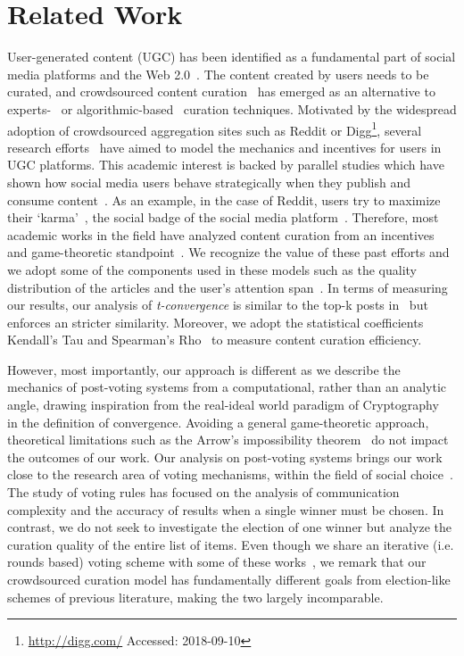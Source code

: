 \section{Related Work}
  User-generated content (UGC) has been identified as a fundamental part of social media platforms and the Web 2.0~\cite{kaplan2010users}. The content created by users needs to be curated, and crowdsourced content curation~\cite{askalidis2013theoretical} has emerged as an alternative to experts-~\cite{stanoevska2012content} or algorithmic-based~\cite{rader2015understanding} curation techniques. Motivated by the widespread adoption of crowdsourced aggregation sites such as Reddit or Digg\footnote{\url{http://digg.com/} Accessed: 2018-09-10}, several research efforts~\cite{das2010ranking,ghosh2011incentivizing} have aimed to model the mechanics and incentives for users in UGC platforms. This academic interest is backed by parallel studies which have shown how
social media users behave strategically when they publish and consume content~\cite{may2014filter}. As an example, in the case of Reddit, users try to maximize their `karma'~\cite{bergstrom2011don}, the social badge of the social media platform~\cite{anderson2013steering}.
   Therefore, most academic works in the field have analyzed content curation from an incentives and game-theoretic standpoint~\cite{ghosh2011incentivizing,das2010ranking,gupte2009news,may2014filter}. We recognize the value of these past efforts and we adopt some of the components used in these models such as the quality distribution of the articles and the user's attention span~\cite{askalidis2013theoretical,ghosh2011incentivizing}. In terms of measuring our results,  our analysis of \textit{t-convergence} is similar to the top-k posts in~\cite{askalidis2013theoretical} but enforces an stricter similarity. Moreover, we adopt the statistical coefficients Kendall's Tau and Spearman's Rho~\cite{xu2013comparative,yue2002power} to measure content curation efficiency.

    However, most importantly, our approach is different as we describe the mechanics of post-voting systems from a computational, rather than an analytic angle, drawing inspiration from the real-ideal world paradigm of Cryptography~\cite{lindell} in the definition of convergence. Avoiding a general game-theoretic approach, theoretical limitations such as the Arrow's impossibility theorem~\cite{arrow1950difficulty} do not impact the outcomes of our work.
    Our analysis on post-voting systems brings our work close to the research area of voting mechanisms, within the field of social choice~\cite{lu2011robust,conitzer2005communication,xia2010compilation}. The study of voting rules has focused on the analysis of communication complexity and the accuracy of results when a single winner must be chosen. In contrast, we do not seek to investigate the election of one winner but analyze the curation quality of the entire list of items. Even though we share an iterative (i.e. rounds based) voting scheme with some of these works~\cite{kalech2011practical}, we remark that our crowdsourced curation model has fundamentally different goals from election-like schemes of previous literature, making the two largely incomparable.

